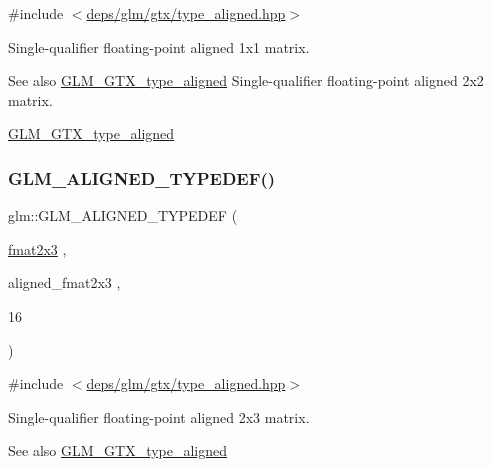 {\ttfamily \#include $<$\hyperlink{gtx_2type__aligned_8hpp}{deps/glm/gtx/type\+\_\+aligned.\+hpp}$>$}

Single-\/qualifier floating-\/point aligned 1x1 matrix. \begin{DoxySeeAlso}{See also}
\hyperlink{group__gtx__type__aligned}{G\+L\+M\+\_\+\+G\+T\+X\+\_\+type\+\_\+aligned} Single-\/qualifier floating-\/point aligned 2x2 matrix. 

\hyperlink{group__gtx__type__aligned}{G\+L\+M\+\_\+\+G\+T\+X\+\_\+type\+\_\+aligned} 
\end{DoxySeeAlso}
\mbox{\label{group__gtx__type__aligned_ga0743b4f4f69a3227b82ff58f6abbad62}} 
\subsubsection{\texorpdfstring{G\+L\+M\+\_\+\+A\+L\+I\+G\+N\+E\+D\+\_\+\+T\+Y\+P\+E\+D\+E\+F()}{GLM\_ALIGNED\_TYPEDEF()}\hspace{0.1cm}{\footnotesize\ttfamily [173/209]}}
{\footnotesize\ttfamily glm\+::\+G\+L\+M\+\_\+\+A\+L\+I\+G\+N\+E\+D\+\_\+\+T\+Y\+P\+E\+D\+EF (\begin{DoxyParamCaption}\item[{\hyperlink{group__gtc__type__precision_ga872da486765a299d84e9e8e6232ed306}{fmat2x3}}]{,  }\item[{aligned\+\_\+fmat2x3}]{,  }\item[{16}]{ }\end{DoxyParamCaption})}



{\ttfamily \#include $<$\hyperlink{gtx_2type__aligned_8hpp}{deps/glm/gtx/type\+\_\+aligned.\+hpp}$>$}

Single-\/qualifier floating-\/point aligned 2x3 matrix. \begin{DoxySeeAlso}{See also}
\hyperlink{group__gtx__type__aligned}{G\+L\+M\+\_\+\+G\+T\+X\+\_\+type\+\_\+aligned} 
\end{DoxySeeAlso}
\mbox{\label{group__gtx__type__aligned_ga1a76b325fdf70f961d835edd182c63dd}} 
